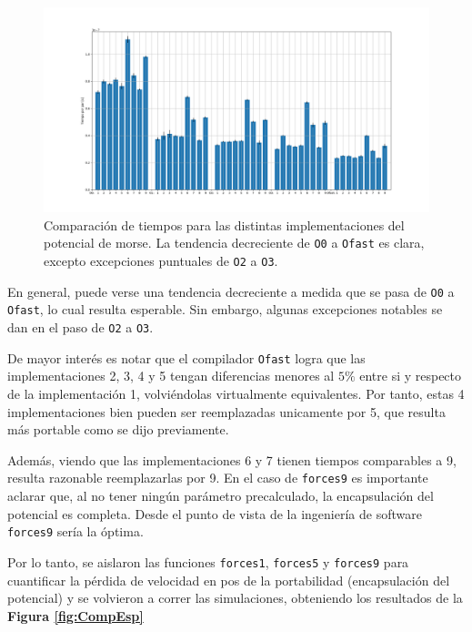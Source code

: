 \documentclass[twoside, 12pt]{article}
\begin{document}
\begin{figure}[h]
	\centering
	\includegraphics[trim = 40mm 20mm 40mm 20mm, clip, scale=0.5]{Imagenes/Comp_tiempos_morse_todos.png}
	\caption{Comparación de tiempos para las distintas implementaciones del potencial de morse. La tendencia decreciente de \texttt{O0} a \texttt{Ofast} es clara, excepto excepciones puntuales de \texttt{O2} a \texttt{O3}.}
	\label{fig:CompTodas}
\end{figure}

En general, puede verse una tendencia decreciente a medida que se pasa de \texttt{O0} a \texttt{Ofast}, lo cual resulta esperable. Sin embargo, algunas excepciones notables se dan en el paso de \texttt{O2} a \texttt{O3}.

De mayor inter\'es es notar que el compilador \texttt{Ofast} logra que las implementaciones 2, 3, 4 y 5 tengan diferencias menores al $5\%$ entre si y respecto de la implementaci\'on 1, volvi\'endolas virtualmente equivalentes.  Por tanto, estas 4 implementaciones bien pueden ser reemplazadas unicamente por 5, que resulta m\'as portable como se dijo previamente.

Adem\'as, viendo que las implementaciones 6 y 7 tienen tiempos comparables a 9, resulta razonable reemplazarlas por 9. En el caso de \texttt{forces9} es importante aclarar que, al no tener ningún parámetro precalculado, la encapsulación del potencial es completa. Desde el punto de vista de la ingeniería de software \texttt{forces9} sería la óptima. 

Por lo tanto, se aislaron las funciones \texttt{forces1}, \texttt{forces5} y \texttt{forces9} para cuantificar la pérdida de velocidad en pos de la portabilidad (encapsulación del potencial) y se volvieron a correr las simulaciones, obteniendo los resultados de la \textbf{Figura \ref{fig:CompEsp}}
\end{document}
